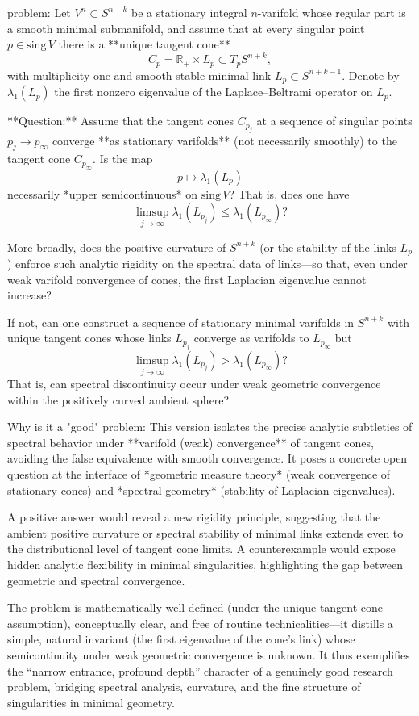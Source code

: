 problem:  
Let \(V^n \subset S^{n+k}\) be a stationary integral \(n\)-varifold whose regular part is a smooth minimal submanifold, and assume that at every singular point \(p \in \mathrm{sing}\, V\) there is a **unique tangent cone**  
\[
C_p = \mathbb{R}_+ \times L_p \subset T_p S^{n+k},
\]
with multiplicity one and smooth stable minimal link \(L_p \subset S^{n+k-1}\).  
Denote by \(\lambda_1(L_p)\) the first nonzero eigenvalue of the Laplace–Beltrami operator on \(L_p\).

**Question:**  
Assume that the tangent cones \(C_{p_j}\) at a sequence of singular points \(p_j \to p_\infty\) converge **as stationary varifolds** (not necessarily smoothly) to the tangent cone \(C_{p_\infty}\).  
Is the map
\[
p \longmapsto \lambda_1(L_p)
\]
necessarily *upper semicontinuous* on \(\mathrm{sing}\, V\)?  
That is, does one have
\[
\limsup_{j\to\infty} \lambda_1(L_{p_j}) \leq \lambda_1(L_{p_\infty})?
\]

More broadly, does the positive curvature of \(S^{n+k}\) (or the stability of the links \(L_p\)) enforce such analytic rigidity on the spectral data of links—so that, even under weak varifold convergence of cones, the first Laplacian eigenvalue cannot increase?

If not, can one construct a sequence of stationary minimal varifolds in \(S^{n+k}\) with unique tangent cones whose links \(L_{p_j}\) converge as varifolds to \(L_{p_\infty}\) but  
\[
\limsup_{j\to\infty} \lambda_1(L_{p_j}) > \lambda_1(L_{p_\infty})?
\]
That is, can spectral discontinuity occur under weak geometric convergence within the positively curved ambient sphere?

Why is it a "good" problem:  
This version isolates the precise analytic subtleties of spectral behavior under **varifold (weak) convergence** of tangent cones, avoiding the false equivalence with smooth convergence. It poses a concrete open question at the interface of *geometric measure theory* (weak convergence of stationary cones) and *spectral geometry* (stability of Laplacian eigenvalues).  

A positive answer would reveal a new rigidity principle, suggesting that the ambient positive curvature or spectral stability of minimal links extends even to the distributional level of tangent cone limits.  
A counterexample would expose hidden analytic flexibility in minimal singularities, highlighting the gap between geometric and spectral convergence.  

The problem is mathematically well-defined (under the unique-tangent-cone assumption), conceptually clear, and free of routine technicalities—it distills a simple, natural invariant (the first eigenvalue of the cone’s link) whose semicontinuity under weak geometric convergence is unknown. It thus exemplifies the “narrow entrance, profound depth” character of a genuinely good research problem, bridging spectral analysis, curvature, and the fine structure of singularities in minimal geometry.